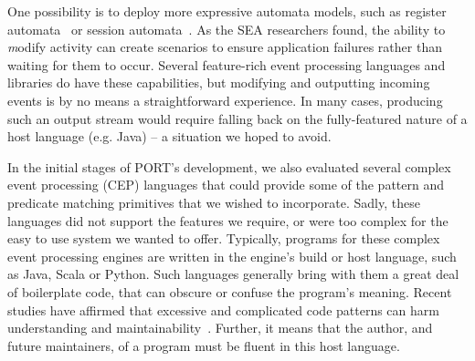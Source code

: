 One possibility is to deploy more expressive automata models, such as register automata~\cite{DBLP:journals/tcs/KaminskiF94} or session automata~\cite{DBLP:journals/corr/BolligHLM14}.  As the 
SEA researchers found,  the ability to
{\textit modify} activity can create scenarios to ensure
application failures rather than  waiting for them to occur.
Several feature-rich event processing
languages and libraries do have these capabilities, but
modifying and outputting
incoming events
is by no means a straightforward experience.
In many cases, producing such an output stream  would require
falling back on the fully-featured nature of a host language (e.g. Java) -- a situation
we hoped to avoid.

In the initial stages of PORT's development, we also
evaluated several
complex event processing (CEP) languages that
could
provide some of the pattern and predicate matching primitives
that we wished to
incorporate.
Sadly,
these languages did not
support  the features
we require,
or were too complex
for the easy to use  system we wanted to offer.
Typically,
programs for these complex event processing engines are
written in the engine's build or host language,
such as Java,
Scala or
Python.
Such languages generally bring with them a great deal of boilerplate code,
that can obscure or confuse
the program's meaning.
Recent studies
have affirmed that excessive and complicated code
patterns can harm
understanding and
maintainability~\cite{misunderstandings}.
Further,
it means that the author,
and future maintainers,
of a
program must be fluent in this host language.


